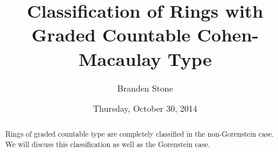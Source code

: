 \documentclass{UAmathtalk}
\author{Branden Stone}
\title{Classification of Rings with\\ Graded Countable Cohen-Macaulay Type}
\date{Thursday, October 30, 2014}
\begin{document}
\maketitle

\begin{abstract}
Rings of graded countable type are completely classified in the non-Gorenstein case. We will discuss this classification as well as the Gorenstein case.
\end{abstract}
\end{document}
